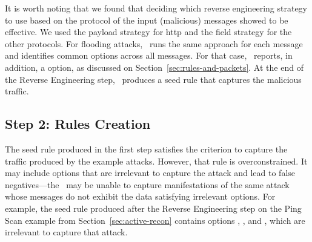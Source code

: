 \documentclass[sigconf,review, anonymous]{acmart}
\begin{document}

It is worth noting that we found that deciding which reverse
engineering strategy to use based on the protocol of the input
(malicious) messages showed to be effective. We used the payload
strategy for http and the field strategy for the other protocols. For
flooding attacks, \tname\ runs the same approach for each message and
identifies common options across all messages. For that case,
\tname\ reports, in addition, a  option, as
discussed on Section~\ref{sec:rules-and-packets}.  At the end of the
Reverse Engineering step, \tname\ produces a seed rule that captures
the malicious traffic.





\subsection{Step 2: Rules Creation}
\label{sec:minimization}

The seed rule produced in the first step satisfies the criterion to
capture the traffic produced by the example attacks. However, that
rule is overconstrained.  It may include options that are irrelevant
to capture the attack and lead to false negatives---the \nids\ may be
unable to capture manifestations of the same attack whose messages do
not exhibit the data satisfying irrelevant options. For example, the
seed rule produced after the Reverse Engineering step on the Ping Scan
example from Section~\ref{sec:active-recon} contains options
, , and
, which are irrelevant to capture that attack.
\end{document}
